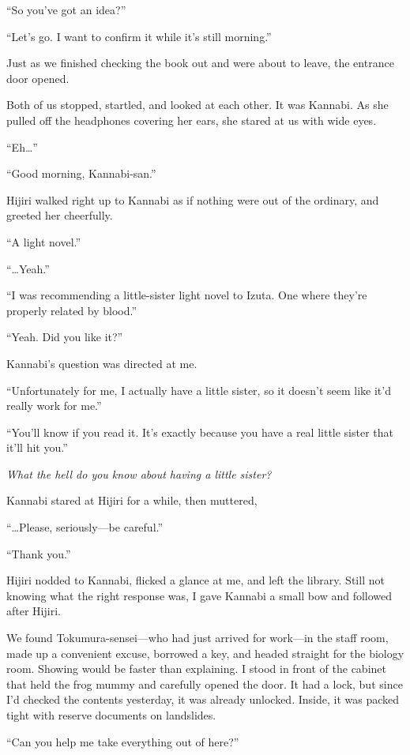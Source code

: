 \documentclass[
    a4paper,
    12pt,
    twoside,
    openany,
    UTF8,
    fontset=windows
]{ctexbook}
\begin{document}
``So you've got an idea?''

``Let's go. I want to confirm it while it's still morning.''

Just as we finished checking the book out and were about to leave, the entrance door opened.

Both of us stopped, startled, and looked at each other. It was Kannabi. As she pulled off the headphones covering her ears, she stared at us with wide eyes.

``Eh\dots''

``Good morning, Kannabi-san.''

Hijiri walked right up to Kannabi as if nothing were out of the ordinary, and greeted her cheerfully.

``A light novel.''

``\dots Yeah.''

``I was recommending a little-sister light novel to Izuta. One where they're properly related by blood.''

``Yeah. Did you like it?''

Kannabi's question was directed at me.

``Unfortunately for me, I actually have a little sister, so it doesn't seem like it'd really work for me.''

``You'll know if you read it. It's exactly because you have a real little sister that it'll hit you.''

\textit{What the hell do you know about having a little sister?}

Kannabi stared at Hijiri for a while, then muttered,

``\dots Please, seriously---be careful.''

``Thank you.''

Hijiri nodded to Kannabi, flicked a glance at me, and left the library. Still not knowing what the right response was, I gave Kannabi a small bow and followed after Hijiri.

We found Tokumura-sensei---who had just arrived for work---in the staff room, made up a convenient excuse, borrowed a key, and headed straight for the biology room. Showing would be faster than explaining. I stood in front of the cabinet that held the frog mummy and carefully opened the door. It had a lock, but since I'd checked the contents yesterday, it was already unlocked. Inside, it was packed tight with reserve documents on landslides.

``Can you help me take everything out of here?''
\end{document}
